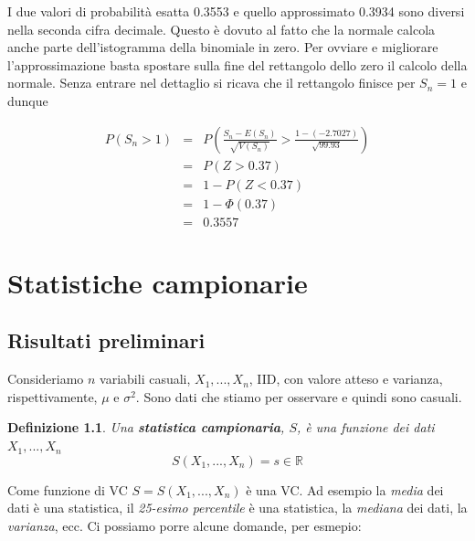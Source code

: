 \documentclass[
  11pt,
]{book}
\theoremstyle{mytheoremstyle}
\theoremstyle{mydefstyle}
\newtheorem{definition}{Definizione}[section]
\newenvironment{nota}
  {
\begin{tcolorbox}[enhanced,breakable,arc=0.1mm,boxrule=1pt,colback=white,colframe=iblue,title=\bf \fontfamily{lmss}\selectfont \faInfoCircle \hspace{.5 cm} Nota,drop fuzzy shadow]
}{
\end{tcolorbox}
  }
\begin{document}
\begin{nota}
I due valori di probabilità esatta 0.3553 e quello approssimato
0.3934 sono diversi nella seconda cifra decimale. Questo è dovuto al
fatto che la normale calcola anche parte dell'istogramma della binomiale
in zero. Per ovviare e migliorare l'approssimazione basta spostare sulla
fine del rettangolo dello zero il calcolo della normale. Senza entrare
nel dettaglio si ricava che il rettangolo finisce per \(S_n=1\) e dunque

\begin{eqnarray*}
      P( S_n   >   1 ) 
        &=& P\left(  \frac { S_n  -  E(S_n) }{ \sqrt{V(S_n)} }  >  \frac { 1  -  ( -2.7027 ) }{\sqrt{ 99.93 }} \right)  \\
                 &=& P\left(  Z   >   0.37 \right) \\    &=& 1-P(Z< 0.37 )\\ 
                 &=&  1-\Phi( 0.37 ) \\ &=&  0.3557 
      \end{eqnarray*}

\end{nota}

\chapter{Statistiche campionarie}\label{statistiche-campionarie}

\section{Risultati preliminari}\label{risultati-preliminari}

Consideriamo \(n\) variabili casuali, \(X_1,...,X_n\), IID, con valore atteso e varianza, rispettivamente, \(\mu\) e \(\sigma^2\). Sono dati che stiamo per osservare e quindi sono casuali.

\begin{info}

\begin{definition}
Una \textbf{statistica campionaria}, \(S\), è una funzione dei dati \(X_1,...,X_n\)
\[S(X_1,...,X_n)=s\in\mathbb{R}\]
\end{definition}

\end{info}

Come funzione di VC \(S=S(X_1,...,X_n)\) è una VC. Ad esempio la \emph{media} dei dati è una statistica, il \emph{25-esimo percentile} è una statistica,
la \emph{mediana} dei dati, la \emph{varianza}, ecc.
Ci possiamo porre alcune domande, per esmepio:
\end{document}
